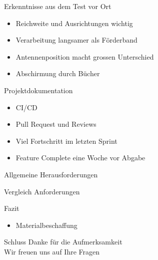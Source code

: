 \documentclass{beamer}
\begin{document}
\begin{frame}{Erkenntnisse aus dem Test vor Ort}
\begin{itemize}
    \item Reichweite und Ausrichtungen wichtig
    \item Verarbeitung langsamer als Förderband
    \item Antennenposition macht grossen Unterschied
    \item Abschirmung durch Bücher
\end{itemize}
\end{frame}
\begin{frame}{Projektdokumentation}
\begin{itemize}
    \item CI/CD
    \item Pull Request und Reviews
    \item Viel Fortschritt im letzten Sprint
    \item Feature Complete eine Woche vor Abgabe
\end{itemize}
\end{frame}
\begin{frame}{Allgemeine Herausforderungen}

\end{frame}
\begin{frame}{Vergleich Anforderungen}

\end{frame}
\begin{frame}{Fazit}
\begin{itemize}
    \item Materialbeschaffung
\end{itemize}
\end{frame}
\begin{frame}{Schluss}
\centering
\Large{Danke für die Aufmerksamkeit}\\
\vspace{1em}
\Large{Wir freuen uns auf Ihre Fragen}
\end{frame}
\end{document}
